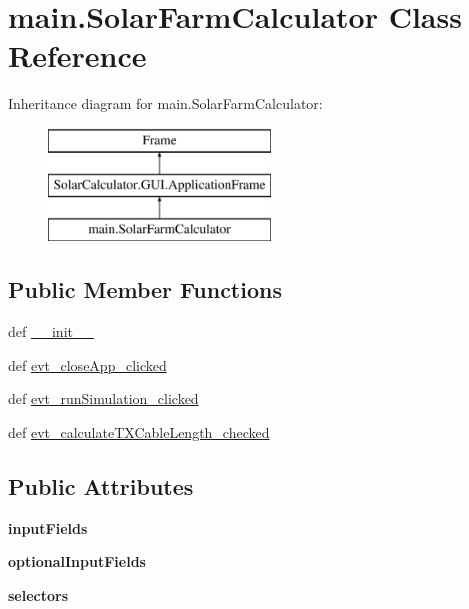 \hypertarget{classmain_1_1_solar_farm_calculator}{\section{main.\-Solar\-Farm\-Calculator Class Reference}
\label{classmain_1_1_solar_farm_calculator}
}
Inheritance diagram for main.\-Solar\-Farm\-Calculator\-:\begin{figure}[H]
\begin{center}
\leavevmode
\includegraphics[height=3.000000cm]{classmain_1_1_solar_farm_calculator}
\end{center}
\end{figure}
\subsection*{Public Member Functions}
\begin{DoxyCompactItemize}
\item 
def \hyperlink{classmain_1_1_solar_farm_calculator_a4f504f72d7c46da50643deefe9920884}{\-\_\-\-\_\-init\-\_\-\-\_\-}
\item 
def \hyperlink{classmain_1_1_solar_farm_calculator_aff8abb14bb8122729e3568cca63cfcf8}{evt\-\_\-close\-App\-\_\-clicked}
\item 
def \hyperlink{classmain_1_1_solar_farm_calculator_a6a7ca0c08f0bc91862c9cf773ccf866e}{evt\-\_\-run\-Simulation\-\_\-clicked}
\item 
def \hyperlink{classmain_1_1_solar_farm_calculator_acd0f0c0ae401b0a9ca6239add29ce2b8}{evt\-\_\-calculate\-T\-X\-Cable\-Length\-\_\-checked}
\end{DoxyCompactItemize}
\subsection*{Public Attributes}
\begin{DoxyCompactItemize}
\item 
\hypertarget{classmain_1_1_solar_farm_calculator_a77e0e7504228d1fc985396dc8a46b0db}{{\bfseries input\-Fields}}\label{classmain_1_1_solar_farm_calculator_a77e0e7504228d1fc985396dc8a46b0db}

\item 
\hypertarget{classmain_1_1_solar_farm_calculator_a54f42e44762150e5d3f92e72cb1e54db}{{\bfseries optional\-Input\-Fields}}\label{classmain_1_1_solar_farm_calculator_a54f42e44762150e5d3f92e72cb1e54db}

\item 
\hypertarget{classmain_1_1_solar_farm_calculator_a0ddbdec4fed01a6f085b828ad036eb72}{{\bfseries selectors}}\label{classmain_1_1_solar_farm_calculator_a0ddbdec4fed01a6f085b828ad036eb72}

\end{DoxyCompactItemize}


